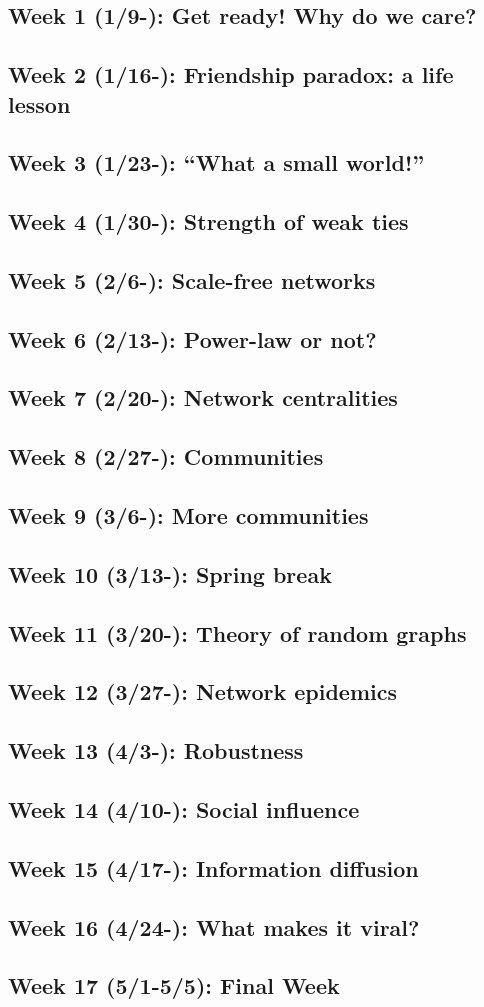 \documentclass[11pt,article,oneside]{memoir}
\begin{document}
\subsection{Week 1 (1/9-):  Get ready! Why do we care?}
\subsection{Week 2 (1/16-):  Friendship paradox: a life lesson}
\subsection{Week 3 (1/23-):  ``What a small world!''}
\subsection{Week 4 (1/30-):  Strength of weak ties} %
\subsection{Week 5 (2/6-):  Scale-free networks} %
\subsection{Week 6 (2/13-):  Power-law or not?}
\subsection{Week 7 (2/20-):  Network centralities} 
\subsection{Week 8 (2/27-):  Communities}
\subsection{Week 9 (3/6-):  More communities}
\subsection{\color{gray}Week 10 (3/13-): Spring break}
\subsection{Week 11 (3/20-): Theory of random graphs}
\subsection{Week 12 (3/27-): Network epidemics}
\subsection{Week 13 (4/3-): Robustness}
\subsection{Week 14 (4/10-): Social influence}
\subsection{Week 15 (4/17-): Information diffusion}
\subsection{Week 16 (4/24-): What makes it viral?}
\subsection{Week 17 (5/1-5/5): Final Week}
\end{document}
